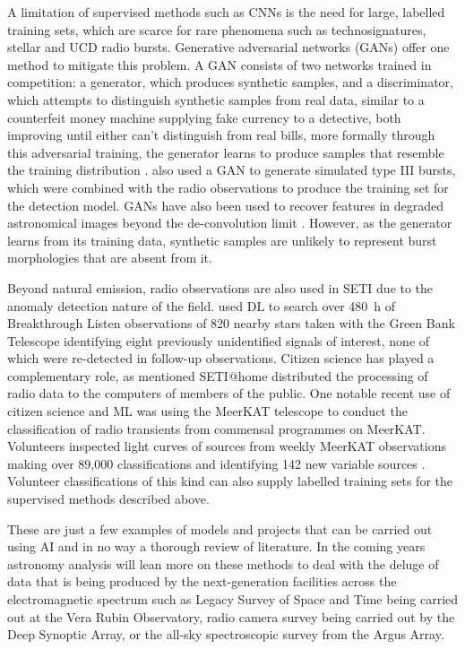 A limitation of supervised methods such as CNNs is the need for large, labelled training sets, which are scarce for rare phenomena such as technosignatures, stellar and UCD radio bursts. Generative adversarial networks (GANs) offer one method to mitigate this problem. A GAN consists of two networks trained in competition: a generator, which produces synthetic samples, and a discriminator, which attempts to distinguish synthetic samples from real data, similar to a counterfeit money machine supplying fake currency to a detective, both improving until either can't distinguish from real bills, more formally through this adversarial training, the generator learns to produce samples that resemble the training distribution \citep{goodfellow_generative_2014}. \cite{scully_improved_2023} also used a GAN to generate simulated type III bursts, which were combined with the radio observations to produce the training set for the detection model. GANs have also been used to recover features in degraded astronomical images beyond the de-convolution limit \citep{schawinski_generative_2017}. However, as the generator learns from its training data, synthetic samples are unlikely to represent burst morphologies that are absent from it. 

Beyond natural emission, radio observations are also used in SETI due to the anomaly detection nature of the field. \cite{ma_deep-learning_2023} used DL to search over 480~h of Breakthrough Listen observations of 820 nearby stars taken with the Green Bank Telescope identifying eight previously unidentified signals of interest, none of which were re-detected in follow-up observations. Citizen science has played a complementary role, as mentioned SETI@home distributed the processing of radio data to the computers of members of the public. One notable recent use of citizen science and ML was using the MeerKAT telescope to conduct the classification of radio transients from commensal programmes on MeerKAT. Volunteers inspected light curves of sources from weekly MeerKAT observations making over 89,000 classifications and identifying 142 new variable sources \citep{andersson_bursts_2023}. Volunteer classifications of this kind can also supply labelled training sets for the supervised methods described above. 

These are just a few examples of models and projects that can be carried out using AI and in no way a thorough review of literature. In the coming years astronomy analysis will lean more on these methods to deal with the deluge of data that is being produced by the next-generation facilities across the electromagnetic spectrum such as Legacy Survey of Space and Time being carried out at the Vera Rubin Observatory, radio camera survey being carried out by the Deep Synoptic Array, or the all-sky spectroscopic survey from the Argus Array. 

